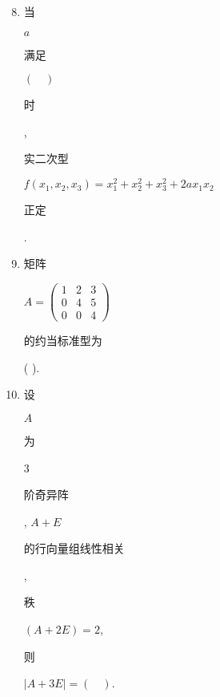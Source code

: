 \documentclass[10pt]{article}
\begin{document}
\begin{enumerate}
  \setcounter{enumi}{7}
  \item \begin{CJK}{UTF8}{mj}当\end{CJK} $a$ \begin{CJK}{UTF8}{mj}满足\end{CJK} $(\quad)$ \begin{CJK}{UTF8}{mj}时\end{CJK}, \begin{CJK}{UTF8}{mj}实二次型\end{CJK} $f\left(x_{1}, x_{2}, x_{3}\right)=x_{1}^{2}+x_{2}^{2}+x_{3}^{2}+2 a x_{1} x_{2}$ \begin{CJK}{UTF8}{mj}正定\end{CJK}.

  \item \begin{CJK}{UTF8}{mj}矩阵\end{CJK} $A=\left(\begin{array}{lll}1 & 2 & 3 \\ 0 & 4 & 5 \\ 0 & 0 & 4\end{array}\right)$ \begin{CJK}{UTF8}{mj}的约当标准型为\end{CJK} ( ).

  \item \begin{CJK}{UTF8}{mj}设\end{CJK} $A$ \begin{CJK}{UTF8}{mj}为\end{CJK} 3 \begin{CJK}{UTF8}{mj}阶奇异阵\end{CJK}, $A+E$ \begin{CJK}{UTF8}{mj}的行向量组线性相关\end{CJK}, \begin{CJK}{UTF8}{mj}秩\end{CJK} $(A+2 E)=2$, \begin{CJK}{UTF8}{mj}则\end{CJK} $|A+3 E|=(\quad)$.


\end{enumerate}
\end{document}
